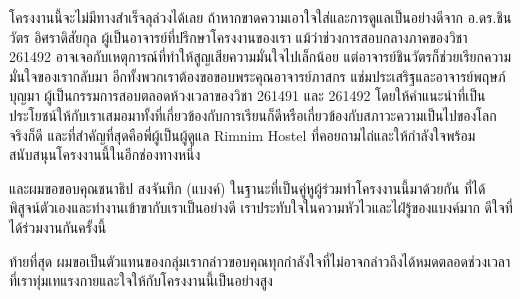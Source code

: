 \iffalse
\begin{dedication}
This document is dedicated to all Chiang Mai University students.

Dedication page is optional.
\end{dedication}
\fi %

\begin{acknowledgments}
โครงงานนี้จะไม่มีทางสำเร็จลุล่วงได้เลย ถ้าหากขาดความเอาใจใส่และการดูแลเป็นอย่างดีจาก อ.ดร.ชินวัตร อิศราดิสัยกุล ผู้เป็นอาจารย์ที่ปรึกษาโครงงานของเรา แม้ว่าช่วงการสอบกลางภาคของวิชา 261492
อาจเจอกับเหตุการณ์ที่ทำให้สูญเสียความมั่นใจไปเล็กน้อย แต่อาจารย์ชินวัตรก็ช่วยเรียกความมั่นใจของเรากลับมา อีกทั้งพวกเราต้องขอขอบพระคุณอาจารย์ภาสกร แช่มประเสริฐและอาจารย์พฤษภ์ บุญมา
ผู้เป็นกรรมการสอบตลอดห้วงเวลาของวิชา 261491 และ 261492 โดยให้คำแนะนำที่เป็นประโยชน์ให้กับเราเสมอมาทั้งที่เกี่ยวข้องกับการเรียนก็ดีหรือเกี่ยวข้องกับสภาวะความเป็นไปของโลกจริงก็ดี
และที่สำคัญที่สุดคือพี่ผู้เป็นผู้ดูแล Rimnim Hostel ที่คอยถามไถ่และให้กำลังใจพร้อมสนับสนุนโครงงานนี้ในอีกช่องทางหนึ่ง

และผมขอขอบคุณชนาธิป สงจันทึก (แบงค์) ในฐานะที่เป็นคู่หูผู้ร่วมทำโครงงานนี้มาด้วยกัน ที่ได้พิสูจน์ตัวเองและทำงานเข้าขากับเราเป็นอย่างดี เราประทับใจในความหัวไวและไฝ่รู้ของแบงค์มาก
ดีใจที่ได้ร่วมงานกันครั้งนี้
    
ท้ายที่สุด ผมขอเป็นตัวแทนของกลุ่มเรากล่าวขอบคุณทุกกำลังใจที่ไม่อาจกล่าวถึงได้หมดตลอดช่วงเวลาที่เราทุ่มเทแรงกายและใจให้กับโครงงานนี้เป็นอย่างสูง
\end{acknowledgments}%
\fi %

\contentspage

\ifproject
\figurelistpage

\tablelistpage
\fi %




